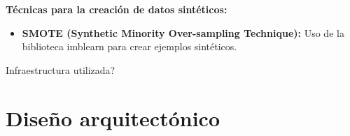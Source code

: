   \textbf{Técnicas para la creación de datos sintéticos:}

  \begin{itemize}
  \tightlist
  \item
   \textbf{SMOTE (Synthetic Minority Over-sampling Technique):} Uso de la biblioteca imblearn para crear ejemplos sintéticos.
  \end{itemize}   
  


Infraestructura utilizada?

\section{Diseño arquitectónico}

